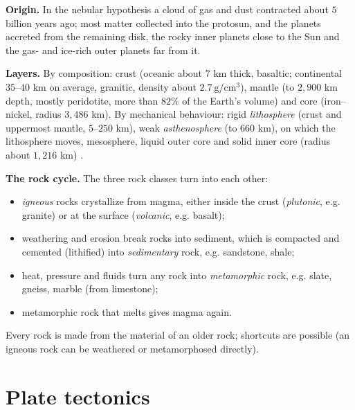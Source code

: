 \textbf{Origin.} In the nebular hypothesis a
cloud of gas and dust contracted about
$5$ billion years ago; most matter
collected into the protosun, and the
planets accreted from the remaining disk,
the rocky inner planets close to the Sun
and the gas- and ice-rich outer planets far
from it.

\textbf{Layers.} By composition: crust
(oceanic about $7$ km thick, basaltic;
continental $35$--$40$ km on average,
granitic, density about
$2.7\ \mathrm{g/cm^3}$), mantle (to
$2{,}900$ km depth, mostly peridotite, more
than $82\%$ of the Earth's volume) and core
(iron--nickel, radius $3{,}486$ km). By
mechanical behaviour: rigid
\emph{lithosphere} (crust and uppermost
mantle, $5$--$250$ km), weak
\emph{asthenosphere} (to $660$ km), on
which the lithosphere moves, mesosphere,
liquid outer core and solid inner core
(radius about $1{,}216$ km)
\cite[Chapter 1]{tarbuckciencias}.

\textbf{The rock cycle.} The three rock
classes turn into each other:
\begin{itemize}
\item \emph{igneous} rocks crystallize from
magma, either inside the crust
(\emph{plutonic}, e.g. granite) or at the
surface (\emph{volcanic}, e.g. basalt);
\item weathering and erosion break rocks
into sediment, which is compacted and
cemented (lithified) into
\emph{sedimentary} rock, e.g. sandstone,
shale;
\item heat, pressure and fluids turn any
rock into \emph{metamorphic} rock, e.g.
slate, gneiss, marble (from limestone);
\item metamorphic rock that melts gives
magma again.
\end{itemize}
Every rock is made from the material of an
older rock; shortcuts are possible (an
igneous rock can be weathered or
metamorphosed directly).

\section{Plate tectonics}
\label{section-plate-tectonics}

